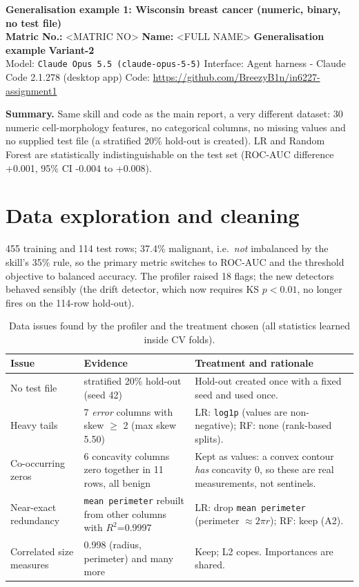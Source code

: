 \documentclass[10pt]{article}
\begin{document}
\begin{center}
{\large\bfseries Generalisation example 1: Wisconsin breast cancer (numeric, binary, no test file)}\\[2pt]
\textbf{Matric No.:} <MATRIC NO> \quad \textbf{Name:} <FULL NAME> \quad \textbf{Generalisation example} \quad \textbf{Variant-2}\\[1pt]
{\footnotesize Model: \texttt{Claude Opus 5.5 (claude-opus-5-5)} \textbar{} Interface: Agent harness - Claude Code 2.1.278 (desktop app) \textbar{} Code: \url{https://github.com/BreezyB1n/in6227-assignment1}}
\end{center}
\vspace{-4pt}
{\small \textbf{Summary.} Same skill and code as the main report, a very different dataset: 30 numeric cell-morphology features, no categorical columns, no missing values and no supplied test file (a stratified 20\% hold-out is created). LR and Random Forest are statistically indistinguishable on the test set (ROC-AUC difference +0.001, 95\% CI -0.004 to +0.008).}

\section{Data exploration and cleaning}
455 training and 114 test rows; 37.4\% malignant, i.e.\ \emph{not} imbalanced by the skill's 35\% rule, so the primary metric switches to ROC-AUC and the threshold objective to balanced accuracy. The profiler raised 18 flags; the new detectors behaved sensibly (the drift detector, which now requires KS $p<0.01$, no longer fires on the 114-row hold-out). \begin{table}[!htb]\centering\footnotesize\setlength{\tabcolsep}{3pt}
\caption{Data issues found by the profiler and the treatment chosen (all statistics learned inside CV folds).}\label{tab:issues}
\begin{tabularx}{\linewidth}{>{\raggedright\arraybackslash}p{2.6cm} Y Y}\toprule
Issue & Evidence & Treatment and rationale\\\midrule
No test file & stratified 20\% hold-out (seed 42) & Hold-out created once with a fixed seed and used once.\\
Heavy tails & 7 \emph{error} columns with skew $\ge$ 2 (max skew 5.50) & LR: \texttt{log1p} (values are non-negative); RF: none (rank-based splits).\\
Co-occurring zeros & 6 concavity columns zero together in 11 rows, all benign & Kept as values: a convex contour \emph{has} concavity 0, so these are real measurements, not sentinels.\\
Near-exact redundancy & \texttt{mean perimeter} rebuilt from other columns with $R^2$=0.9997 & LR: drop \texttt{mean perimeter} (perimeter $\approx 2\pi r$); RF: keep (A2).\\
Correlated size measures & 0.998 (radius, perimeter) and many more & Keep; L2 copes. Importances are shared.\\
\bottomrule\end{tabularx}\end{table}
\end{document}
